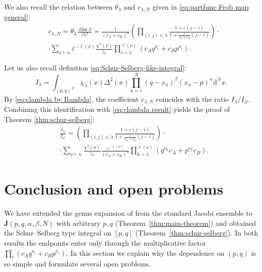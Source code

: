 \documentclass{article}
\newcommand{\dif}{\mathrm{d}}
\theoremstyle{plain}
\theoremstyle{definition}
\numberwithin{equation}{section}
\begin{document}
We also recall the relation between $\theta_\lambda$ and $c_{\lambda, N}$ given in \eqref{eq:partfunc Frob map general}:
\begin{equation}
    \label{eq:clambda result}
    \begin{aligned}
        & c_{\lambda, N} = \theta_\lambda \frac{\dim \lambda}{|\lambda|!} = \frac{1}{(c_A+c_B)^{n} } \left(\prod_{(i,j) \in \lambda} \frac{1+ \varepsilon (j-i)}{1+ \frac{\varepsilon}{c_A+c_B} (j-i)}\right) \cdot \\
        &  \cdot \sum_{\nu \vdash n}   \varepsilon^{-\ell(\nu)}  \frac{\chi^\lambda(\nu)}{z_\nu}\prod_{i=1}^{\ell(\nu)} (c_A q^{\nu_i} + c_B p^{\nu_i}).
    \end{aligned}
\end{equation}

Let us also recall definition \eqref{eq:Schur-Selberg-like-integral}:
\begin{equation}
    I_{\lambda} = \int_{(p,q)^{N}} \chi_{\lambda}(x) \Delta^{2}(x)\prod_{a=1}^{N}(q-x_{a})^{\beta} (x_{a}-p)^{\alpha} \dif^{N}x.
\end{equation}
By \eqref{eq:clambda by Ilambda}, the coefficient $c_{\lambda, N}$ coincides with the ratio $I_\lambda/I_\varnothing$. Combining this identification with \eqref{eq:clambda result} yields the proof of Theorem \ref{thm:schur-selberg}:
\begin{equation}
    \begin{aligned}
        &\frac{I_\lambda}{I_{\varnothing}}  = \left(\prod_{(i,j) \in \lambda} \frac{1+ \varepsilon (j-i)}{1+ \frac{\varepsilon}{c_{A}+c_{B}} (j-i)}\right) \cdot \\
        & \cdot \sum\limits_{\nu \vdash n} \frac{\chi^{\lambda}(\nu)}{z_{\nu}} \frac{\varepsilon^{-\ell(\nu)}}{(c_{A}+c_{B})^n}\prod_{k=1}^{\ell(\nu)} (q^{\nu_{k}} c_{A}+ p^{\nu_{k}}c_B).
    \end{aligned}
\end{equation}


\section{Conclusion and open problems}
\label{sec:discussion}

We have extended the genus expansion of \cite{gisonni2021jacobi} from the
standard Jacobi ensemble to $\mathbf J(p,q,\alpha,\beta,N)$ with arbitrary
$p,q$ (Theorem~\ref{thm:main-theorem}) and obtained the Schur--Selberg type
integral on $[p,q]$ (Theorem~\ref{thm:schur-selberg}). In both results the
endpoints enter only through the multiplicative factor
$\prod_i (c_A q^{\nu_i}+c_B p^{\nu_i})$. In this section we explain why the
dependence on $(p,q)$ is so simple and formulate several open problems.
\end{document}
